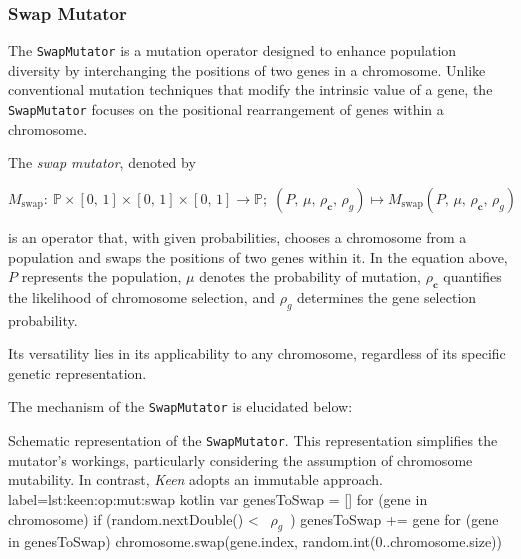 
\subsubsection{Swap Mutator}
\label{sec:keen:op:mut:swap}
  The \texttt{SwapMutator} is a mutation operator designed to enhance 
  population diversity by interchanging the positions of two genes in a 
  chromosome. Unlike conventional mutation techniques that modify the intrinsic 
  value of a gene, the \texttt{SwapMutator} focuses on the positional 
  rearrangement of genes within a chromosome.

  \begin{definition}
  \label{def:keen:op:mut:swap}
    The \emph{swap mutator}, denoted by

    \begin{equation}
      M_\mathrm{swap} :\: \mathbb{P} \times [0,\, 1] \times [0,\, 1] 
        \times [0,\, 1] \to \mathbb{P};\;
      (P,\, \mu,\, \rho_\mathbf{c},\, \rho_g) 
        \mapsto M_\mathrm{swap}(P,\, \mu,\, \rho_\mathbf{c},\, \rho_g)
    \end{equation}

    is an operator that, with given probabilities, chooses a chromosome from a 
    population and swaps the positions of two genes within it. In the equation 
    above, \(P\) represents the population, \(\mu\) denotes the probability of 
    mutation, \(\rho_\mathbf{c}\) quantifies the likelihood of chromosome 
    selection, and \(\rho_g\) determines the gene selection probability.

    Its versatility lies in its applicability to any chromosome, regardless of 
    its specific genetic representation.
  \end{definition}

  The mechanism of the \texttt{SwapMutator} is elucidated below:

  \begin{code}{
    Schematic representation of the \texttt{SwapMutator}. This representation simplifies the mutator's workings, particularly considering the assumption of chromosome mutability. In contrast, \textit{Keen} adopts an immutable approach.
  }{
    label=lst:keen:op:mut:swap
  }{kotlin}
    var genesToSwap = []
    for (gene in chromosome) {
        if (random.nextDouble() < ~\(\rho_g\)~) {
            genesToSwap += gene
        }
    }
    for (gene in genesToSwap) {
        chromosome.swap(gene.index, random.int(0..chromosome.size))
    }
  \end{code}

